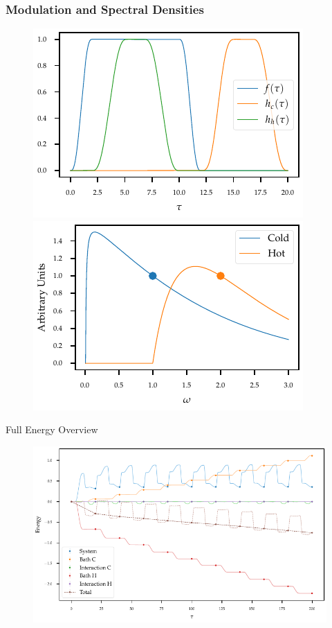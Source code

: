 \documentclass[10pt, aspectratio=169]{beamer}
\begin{document}
\begin{frame}
  \frametitle{Modulation and Spectral Densities}
  \begin{figure}[h]
    \centering
    \includegraphics{figs/otto/modulation}
    \includegraphics{figs/otto/spectral_densities}
  \end{figure}
\end{frame}

\begin{frame}{Full Energy Overview}
  \begin{figure}[h]
    \centering
    \includegraphics{figs/otto/energy_strobe}
  \end{figure}
\end{frame}
\end{document}
